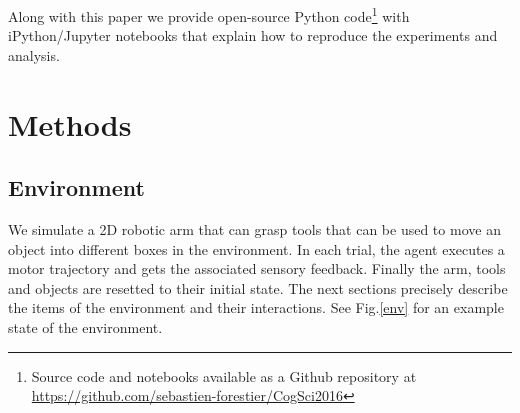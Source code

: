\documentclass[10pt,letterpaper]{article}
\begin{document}
	Along with this paper we provide open-source Python code\footnote{Source code and notebooks available as a Github repository at \url{https://github.com/sebastien-forestier/CogSci2016}} 
	with iPython/Jupyter notebooks that explain how to reproduce the experiments and analysis. 
	
%

\section{Methods}

	\subsection{Environment}
	
		We simulate a 2D robotic arm that can grasp tools that can be used to move an object into different boxes in the environment. 		
		In each trial, the agent executes a motor trajectory and gets the associated sensory feedback. 
		Finally the arm, tools and objects are resetted to their initial state.
		The next sections precisely describe the items of the environment and their interactions.	
		See Fig.\ref{env} for an example state of the environment. 
		
\end{document}
